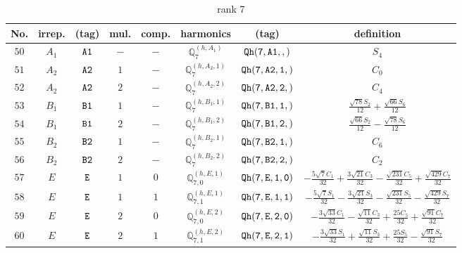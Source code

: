 \documentclass[fleqn,8pt]{jsarticle}
\begin{document}
\begin{table}[ht!]
\begin{center}
\caption{rank 7}
\renewcommand{\arraystretch}{1.3}
\begin{tabular}{cccccccc} \hline \hline
No. & irrep. & (tag) & mul. & comp. & harmonics & (tag) & definition \\ \hline
$ 50 $ & $ A_{1} $ & $ {\tt A1} $ & $ - $ & $ - $ & $ \mathbb{Q}_{7}^{(h,A_{1})} $ & $ {\tt Qh(7,A1,,)} $ & $ S_{4} $ \\
$ 51 $ & $ A_{2} $ & $ {\tt A2} $ & $ 1 $ & $ - $ & $ \mathbb{Q}_{7}^{(h,A_{2},1)} $ & $ {\tt Qh(7,A2,1,)} $ & $ C_{0} $ \\
$ 52 $ & $ A_{2} $ & $ {\tt A2} $ & $ 2 $ & $ - $ & $ \mathbb{Q}_{7}^{(h,A_{2},2)} $ & $ {\tt Qh(7,A2,2,)} $ & $ C_{4} $ \\
$ 53 $ & $ B_{1} $ & $ {\tt B1} $ & $ 1 $ & $ - $ & $ \mathbb{Q}_{7}^{(h,B_{1},1)} $ & $ {\tt Qh(7,B1,1,)} $ & $ \frac{\sqrt{78} S_{2}}{12} + \frac{\sqrt{66} S_{6}}{12} $ \\
$ 54 $ & $ B_{1} $ & $ {\tt B1} $ & $ 2 $ & $ - $ & $ \mathbb{Q}_{7}^{(h,B_{1},2)} $ & $ {\tt Qh(7,B1,2,)} $ & $ \frac{\sqrt{66} S_{2}}{12} - \frac{\sqrt{78} S_{6}}{12} $ \\
$ 55 $ & $ B_{2} $ & $ {\tt B2} $ & $ 1 $ & $ - $ & $ \mathbb{Q}_{7}^{(h,B_{2},1)} $ & $ {\tt Qh(7,B2,1,)} $ & $ C_{6} $ \\
$ 56 $ & $ B_{2} $ & $ {\tt B2} $ & $ 2 $ & $ - $ & $ \mathbb{Q}_{7}^{(h,B_{2},2)} $ & $ {\tt Qh(7,B2,2,)} $ & $ C_{2} $ \\
$ 57 $ & $ E $ & $ {\tt E} $ & $ 1 $ & $ 0 $ & $ \mathbb{Q}_{7,0}^{(h,E,1)} $ & $ {\tt Qh(7,E,1,0)} $ & $ - \frac{5 \sqrt{7} C_{1}}{32} + \frac{3 \sqrt{21} C_{3}}{32} - \frac{\sqrt{231} C_{5}}{32} + \frac{\sqrt{429} C_{7}}{32} $ \\
$ 58 $ & $ E $ & $ {\tt E} $ & $ 1 $ & $ 1 $ & $ \mathbb{Q}_{7,1}^{(h,E,1)} $ & $ {\tt Qh(7,E,1,1)} $ & $ - \frac{5 \sqrt{7} S_{1}}{32} - \frac{3 \sqrt{21} S_{3}}{32} - \frac{\sqrt{231} S_{5}}{32} - \frac{\sqrt{429} S_{7}}{32} $ \\
$ 59 $ & $ E $ & $ {\tt E} $ & $ 2 $ & $ 0 $ & $ \mathbb{Q}_{7,0}^{(h,E,2)} $ & $ {\tt Qh(7,E,2,0)} $ & $ - \frac{3 \sqrt{33} C_{1}}{32} - \frac{\sqrt{11} C_{3}}{32} + \frac{25 C_{5}}{32} + \frac{\sqrt{91} C_{7}}{32} $ \\
$ 60 $ & $ E $ & $ {\tt E} $ & $ 2 $ & $ 1 $ & $ \mathbb{Q}_{7,1}^{(h,E,2)} $ & $ {\tt Qh(7,E,2,1)} $ & $ - \frac{3 \sqrt{33} S_{1}}{32} + \frac{\sqrt{11} S_{3}}{32} + \frac{25 S_{5}}{32} - \frac{\sqrt{91} S_{7}}{32} $ \\

\end{tabular}
\end{center}
\end{table}
\end{document}
